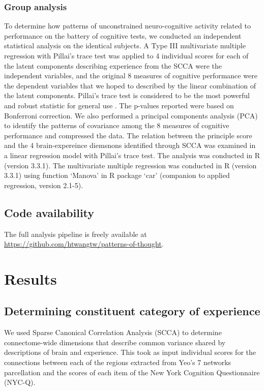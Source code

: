 \subsubsection{Group analysis}
\label{study2:method:manova}
To determine how patterns of unconstrained neuro-cognitive activity related to performance on the battery of cognitive tests, we conducted an independent statistical analysis on the identical subjects. A Type III multivariate multiple regression with Pillai’s trace test was applied to 4 individual scores for each of the latent components describing experience from the SCCA  were the independent variables, and the original 8 measures of cognitive performance were the dependent variables that we hoped to described by the linear combination of the latent components. Pillai’s trace test is considered to be the most powerful and robust statistic for general use \cite{Huberty2006}.%
The p-values reported were based on Bonferroni correction. We also performed a principal components analysis (PCA) to identify the patterns of covariance among the 8 measures of cognitive performance and compressed the data. The relation between the principle score and the 4 brain-expereince diemsnons identified through SCCA was examined in a linear regression model with Pillai’s trace test. The analysis was conducted in R (version 3.3.1).  The multivariate multiple regression was conducted in R (version 3.3.1) using function ‘Manova’ in R package ‘car’ (companion to applied regression, version 2.1-5). 

\subsection{Code availability}
\label{study2:method:code}
The full analysis pipeline is freely available at \url{https://github.com/htwangtw/patterns-of-thought}. 


\section{Results}
\label{study2:results}

\subsection{Determining constituent category of experience}
\label{study2:results:cca}
We used Sparse Canonical Correlation Analysis (SCCA) to determine connectome-wide dimensions that describe common variance shared by descriptions of brain and experience. This took as input individual scores for the connections between each of the regions extracted from Yeo’s 7 networks parcellation and the scores of each item of the New York Cognition Questionnaire (NYC-Q).

